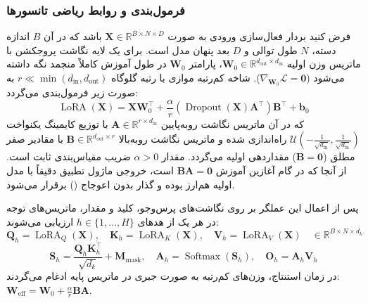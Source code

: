 \subsubsection*{فرمول‌بندی و روابط ریاضی تانسورها}
فرض کنید بردار فعال‌سازی ورودی به صورت $\mathbf{X} \in \mathbb{R}^{B \times N \times D}$ باشد که در آن $B$ اندازه دسته، $N$ طول توالی و $D$ بعد پنهان مدل است. برای یک لایه نگاشت پروجکشن با ماتریس وزن اولیه $\mathbf{W}_0 \in \mathbb{R}^{d_{\text{out}} \times d_{\text{in}}}$، پارامتر $\mathbf{W}_0$ در طول آموزش کاملاً منجمد نگه داشته می‌شود ($\nabla_{\mathbf{W}_0} \mathcal{L} = \mathbf{0}$). شاخه کم‌رتبه موازی با رتبه گلوگاه $r \ll \min(d_{\text{in}}, d_{\text{out}})$ به صورت زیر فرمول‌بندی می‌گردد:
\begin{equation}
\operatorname{LoRA}(\mathbf{X}) = \mathbf{X} \mathbf{W}_0^\top + \frac{\alpha}{r} \left( \operatorname{Dropout}(\mathbf{X}) \mathbf{A}^\top \right) \mathbf{B}^\top + \mathbf{b}_0
\end{equation}
که در آن ماتریس نگاشت روبه‌پایین $\mathbf{A} \in \mathbb{R}^{r \times d_{\text{in}}}$ با توزیع کایمینگ یکنواخت $\mathcal{U}\left(-\frac{1}{\sqrt{d_{\text{in}}}}, \frac{1}{\sqrt{d_{\text{in}}}}\right)$ راه‌اندازی شده و ماتریس نگاشت روبه‌بالا $\mathbf{B} \in \mathbb{R}^{d_{\text{out}} \times r}$ با مقادیر صفر مطلق ($\mathbf{B} = \mathbf{0}$) مقداردهی اولیه می‌گردد. مقدار $\alpha > 0$ ضریب مقیاس‌بندی ثابت است. از آنجا که در گام آغازین آموزش $\mathbf{B} \mathbf{A} = \mathbf{0}$ است، خروجی ماژول تطبیق دقیقاً با مدل اولیه هم‌ارز بوده و گذار بدون اعوجاج () برقرار می‌شود.

پس از اعمال این عملگر بر روی نگاشت‌های پرس‌وجو، کلید و مقدار، ماتریس‌های توجه در هر یک از هدهای $h \in \{1, \dots, H\}$ ارزیابی می‌شوند:
\begin{equation}
\mathbf{Q}_h = \operatorname{LoRA}_Q(\mathbf{X}), \quad \mathbf{K}_h = \operatorname{LoRA}_K(\mathbf{X}), \quad \mathbf{V}_h = \operatorname{LoRA}_V(\mathbf{X}) \quad \in \mathbb{R}^{B \times N \times d_k}
\end{equation}
\begin{equation}
\mathbf{S}_h = \frac{\mathbf{Q}_h \mathbf{K}_h^\top}{\sqrt{d_k}} + \mathbf{M}_{\text{mask}}, \quad \mathbf{A}_h = \operatorname{Softmax}(\mathbf{S}_h), \quad \mathbf{O}_h = \mathbf{A}_h \mathbf{V}_h
\end{equation}
در زمان استنتاج، وزن‌های کم‌رتبه به صورت جبری در ماتریس پایه ادغام می‌گردند: $\mathbf{W}_{\text{eff}} = \mathbf{W}_0 + \frac{\alpha}{r} \mathbf{B} \mathbf{A}$.

